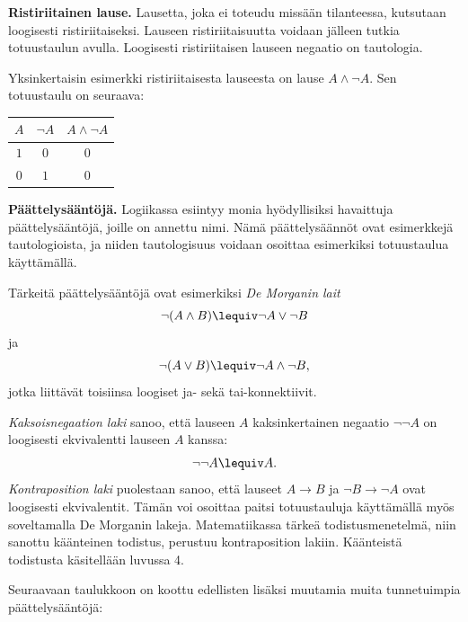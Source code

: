{\bf Ristiriitainen lause.}
Lausetta, joka ei toteudu missään tilanteessa, kutsutaan loogisesti ristiriitaiseksi. Lauseen ristiriitaisuutta voidaan jälleen tutkia totuustaulun avulla. Loogisesti ristiriitaisen lauseen negaatio on tautologia. 

Yksinkertaisin esimerkki ristiriitaisesta lauseesta on lause $A\land \lnot A$. Sen totuustaulu on seuraava:

\bigskip

\begin{center}
\begin{tabular}{|c|c|c|}\hline
$A$ & $\lnot A$ & $A \land  \lnot A$ \\ \hline
$1$ & $0$ & $0$\\
$0$ & $1$ & $0$\\ \hline
\end{tabular}
\end{center}

\bigskip


{\bf Päättelysääntöjä.} Logiikassa esiintyy monia hyödyllisiksi havaittuja päättelysääntöjä, joille on annettu nimi. Nämä päättelysäännöt ovat esimerkkejä tautologioista, ja niiden tautologisuus voidaan osoittaa esimerkiksi totuustaulua käyttämällä.

Tärkeitä päättelysääntöjä ovat esimerkiksi {\em De Morganin lait}
\[
\lnot(A \land B) \lequiv \lnot A \lor \lnot B
\]
ja
\[
\lnot(A \lor B) \lequiv \lnot A \land \lnot B,
\]
jotka liittävät toisiinsa loogiset ja- sekä tai-konnektiivit.

{\em Kaksoisnegaation laki} sanoo, että lauseen $A$ kaksinkertainen negaatio $\lnot \lnot A$ on loogisesti ekvivalentti lauseen $A$ kanssa:
\[
\lnot \lnot A \lequiv A.
\]
{\em Kontraposition laki} puolestaan sanoo, että lauseet $A\to B$ ja $\lnot B \to \lnot A$ ovat loogisesti ekvivalentit. Tämän voi osoittaa paitsi totuustauluja käyttämällä myös soveltamalla De Morganin lakeja.
Matematiikassa tärkeä todistusmenetelmä, niin sanottu käänteinen todistus, perustuu kontraposition lakiin. Käänteistä todistusta käsitellään luvussa 4.


Seuraavaan taulukkoon on koottu edellisten lisäksi muutamia muita tunnetuimpia päättelysääntöjä: %

